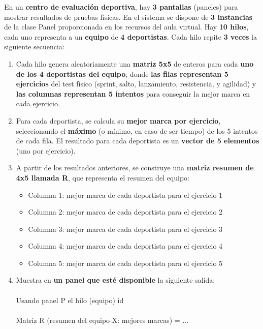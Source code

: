 \documentclass[a4paper,12pt,titlepage,oneside]{article}
\begin{document}
    \iffalse
    En un \textbf{centro de evaluación deportiva}, hay \textbf{3 pantallas} (paneles) para mostrar resultados de 
    pruebas físicas. En el sistema se dispone de \textbf{3 instancias} de la clase Panel proporcionada en 
    los recursos del aula virtual. Hay \textbf{10 hilos}, cada uno representa a un \textbf{equipo} de \textbf{4 deportistas}. 
    Cada hilo repite \textbf{3 veces} la siguiente secuencia:
    \begin{enumerate}[label=\arabic*)]
        \item Cada hilo genera aleatoriamente una \textbf{matriz 5x5} de enteros para cada \textbf{uno de los 4 
        deportistas del equipo}, donde \textbf{las filas representan 5 ejercicios} del test físico 
        (sprint, salto, lanzamiento, resistencia, y agilidad) y \textbf{las columnas representan 5 
        intentos} para conseguir la mejor marca en cada ejercicio. 
        \item Para cada deportista, se calcula su \textbf{mejor marca por ejercicio}, seleccionando 
        el \textbf{máximo} (o mínimo, en caso de ser tiempo) de los 5 intentos de cada fila. El 
        resultado para cada deportista es un \textbf{vector de 5 elementos} (uno por ejercicio). 
        \item A partir de los resultados anteriores, se construye una \textbf{matriz resumen de 
        4x5 llamada R}, que representa el resumen del equipo: 
        \begin{itemize}
            \item Columna 1: mejor marca de cada deportista para el ejercicio 1 
            \item Columna 2: mejor marca de cada deportista para el ejercicio 2
            \item Columna 3: mejor marca de cada deportista para el ejercicio 3 
            \item Columna 4: mejor marca de cada deportista para el ejercicio 4 
            \item Columna 5: mejor marca de cada deportista para el ejercicio 5
        \end{itemize}
        \item Muestra en \textbf{un panel que esté disponible} la siguiente salida: \\
        \\
        \textcolor{black!70}{
        Usando panel P el hilo (equipo) id \\
        \\
        Matriz R (resumen del equipo X: mejores marcas) = ... \\
}
\end{enumerate}
\end{document}
